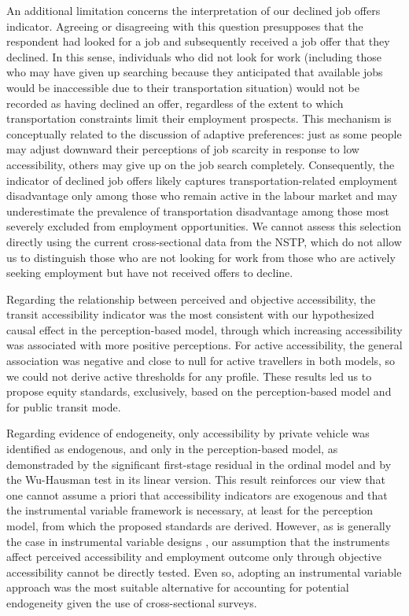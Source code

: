 \documentclass[preprint, 3p,
authoryear]{elsarticle} %
\begin{document}
An additional limitation concerns the interpretation of our declined job
offers indicator. Agreeing or disagreeing with this question presupposes
that the respondent had looked for a job and subsequently received a job
offer that they declined. In this sense, individuals who did not look
for work (including those who may have given up searching because they
anticipated that available jobs would be inaccessible due to their
transportation situation) would not be recorded as having declined an
offer, regardless of the extent to which transportation constraints
limit their employment prospects. This mechanism is conceptually related
to the discussion of adaptive preferences: just as some people may
adjust downward their perceptions of job scarcity in response to low
accessibility, others may give up on the job search completely.
Consequently, the indicator of declined job offers likely captures
transportation-related employment disadvantage only among those who
remain active in the labour market and may underestimate the prevalence
of transportation disadvantage among those most severely excluded from
employment opportunities. We cannot assess this selection directly using
the current cross-sectional data from the NSTP, which do not allow us to
distinguish those who are not looking for work from those who are
actively seeking employment but have not received offers to decline.

Regarding the relationship between perceived and objective
accessibility, the transit accessibility indicator was the most
consistent with our hypothesized causal effect in the perception-based
model, through which increasing accessibility was associated with more
positive perceptions. For active accessibility, the general association
was negative and close to null for active travellers in both models, so
we could not derive active thresholds for any profile. These results led
us to propose equity standards, exclusively, based on the
perception-based model and for public transit mode.

Regarding evidence of endogeneity, only accessibility by private vehicle
was identified as endogenous, and only in the perception-based model, as
demonstraded by the significant first-stage residual in the ordinal
model and by the Wu-Hausman test in its linear version. This result
reinforces our view that one cannot assume a priori that accessibility
indicators are exogenous and that the instrumental variable framework is
necessary, at least for the perception model, from which the proposed
standards are derived. However, as is generally the case in instrumental
variable designs \citep{cunningham2021causal, huntington-klein2021}, our
assumption that the instruments affect perceived accessibility and
employment outcome only through objective accessibility cannot be
directly tested. Even so, adopting an instrumental variable approach was
the most suitable alternative for accounting for potential endogeneity
given the use of cross-sectional surveys.
\end{document}
